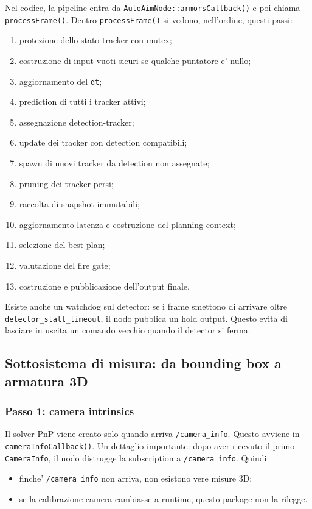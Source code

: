 \documentclass[11pt,a4paper]{article}
\newcommand{\code}[1]{\texttt{#1}}
\newcommand{\topic}[1]{\texttt{#1}}
\begin{document}
Nel codice, la pipeline entra da \code{AutoAimNode::armorsCallback()} e poi chiama \code{processFrame()}. Dentro \code{processFrame()} si vedono, nell'ordine, questi passi:
\begin{enumerate}[leftmargin=1.4em]
  \item protezione dello stato tracker con mutex;
  \item costruzione di input vuoti sicuri se qualche puntatore e' nullo;
  \item aggiornamento del \code{dt};
  \item prediction di tutti i tracker attivi;
  \item assegnazione detection-tracker;
  \item update dei tracker con detection compatibili;
  \item spawn di nuovi tracker da detection non assegnate;
  \item pruning dei tracker persi;
  \item raccolta di snapshot immutabili;
  \item aggiornamento latenza e costruzione del planning context;
  \item selezione del best plan;
  \item valutazione del fire gate;
  \item costruzione e pubblicazione dell'output finale.
\end{enumerate}

Esiste anche un watchdog sul detector: se i frame smettono di arrivare oltre \code{detector\_stall\_timeout}, il nodo pubblica un hold output. Questo evita di lasciare in uscita un comando vecchio quando il detector si ferma.

\subsection{Sottosistema di misura: da bounding box a armatura 3D}

\subsubsection{Passo 1: camera intrinsics}

Il solver PnP viene creato solo quando arriva \topic{/camera_info}. Questo avviene in \code{cameraInfoCallback()}. Un dettaglio importante: dopo aver ricevuto il primo \code{CameraInfo}, il nodo distrugge la subscription a \topic{/camera_info}. Quindi:
\begin{itemize}[leftmargin=1.4em]
  \item finche' \topic{/camera_info} non arriva, non esistono vere misure 3D;
  \item se la calibrazione camera cambiasse a runtime, questo package non la rilegge.
\end{itemize}
\end{document}
